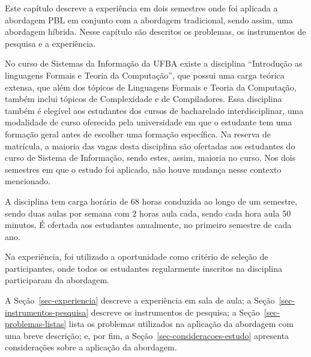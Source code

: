 
\label{cap-estudo}
\acresetall
Este capítulo descreve a experiência em dois semestres onde foi aplicada a abordagem \ac{PBL}
em conjunto com a abordagem tradicional, sendo assim, uma abordagem híbrida.
Nesse capítulo são descritos os problemas, os instrumentos de pesquisa e a
experiência.

No curso de Sistemas da Informação da \ac{UFBA} existe
a disciplina ``Introdução as linguagens Formais e Teoria da Computação'',
que possui uma carga teórica extensa, que além dos tópicos de Linguagens Formais e Teoria
da Computação, também inclui tópicos de Complexidade e de Compiladores.
Essa disciplina também é elegível aos estudantes dos cursos de bacharelado
interdisciplinar, uma modalidade de curso oferecida pela universidade
em que o estudante tem uma formação geral antes de escolher
uma formação específica.
Na reserva de matrícula, a maioria das vagas desta disciplina são ofertadas aos
estudantes do curso de Sistema de Informação, sendo estes, assim, maioria no curso.
Nos dois semestres em que o estudo foi aplicado, não houve mudança nesse
contexto mencionado.

A disciplina tem carga horária de 68 horas conduzida ao longo de um semestre, sendo duas
aulas por semana com 2 horas aula cada, sendo cada hora aula 50 minutos.
É ofertada aos estudantes anualmente, no primeiro semestre de cada ano.

Na experiência, foi utilizado a oportunidade como critério de seleção de participantes, onde todos os
estudantes regularmente inscritos na disciplina participaram da abordagem.

A Seção~\ref{sec-experiencia} descreve a experiência em sala de aula;
a Seção~\ref{sec-instrumentos-pesquisa} descreve os instrumentos de pesquisa;
a Seção~\ref{sec-problemas-listas} lista os problemas utilizados
na aplicação da abordagem com uma breve
descrição;
e, por fim, a Seção~\ref{sec-consideracoes-estudo} apresenta
considerações sobre a aplicação da abordagem.





